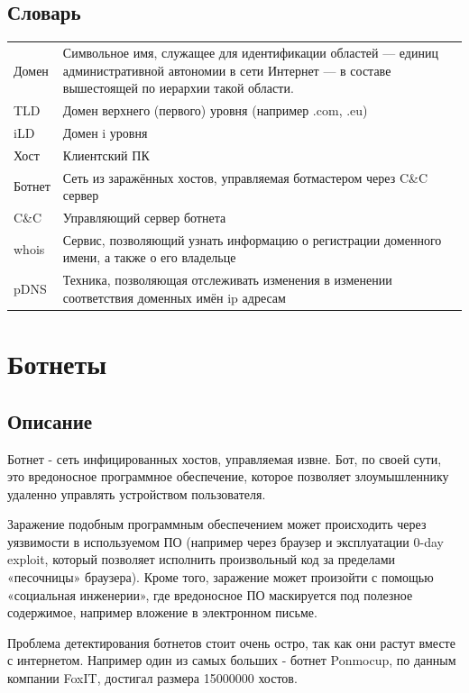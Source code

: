 \documentclass[14pt]{extreport}
\begin{document}
	\section{Словарь}
	\begin{tabular}{p{3cm} p{10cm}}
	\hline
			Домен & Символьное имя, служащее для идентификации областей — единиц административной автономии в сети Интернет — в составе вышестоящей по иерархии такой области. \\ 
			TLD & Домен верхнего (первого) уровня (например .com, .eu) \\
			iLD & Домен i уровня \\
			Хост & Клиентский ПК \\
			Ботнет & Сеть из заражённых хостов, управляемая ботмастером через C\&C сервер \\
			C\&C & Управляющий сервер ботнета \\
			whois & Сервис, позволяющий узнать информацию о регистрации доменного имени, а также о его владельце \\
			pDNS & Техника, позволяющая отслеживать изменения в изменении соответствия доменных имён ip адресам \\
			 \hline

	\end{tabular}
	
	\chapter{Ботнеты}
	\section{Описание}
	Ботнет - сеть инфицированных хостов, управляемая извне. Бот, по своей сути, это вредоносное программное обеспечение, которое позволяет злоумышленнику удаленно управлять устройством пользователя.
	
	Заражение подобным программным обеспечением может происходить через
уязвимости в используемом ПО (например через браузер и эксплуатации 0-day
exploit, который позволяет исполнить произвольный код за пределами
«песочницы» браузера). Кроме того, заражение может произойти с помощью
«социальная инженерии», где вредоносное ПО маскируется под полезное
содержимое, например вложение в электронном письме.

	Проблема детектирования ботнетов стоит очень остро, так как они растут вместе с интернетом. Например один из самых больших - ботнет Ponmocup, по данным компании FoxIT, достигал размера 15000000 хостов.
	
\end{document}
